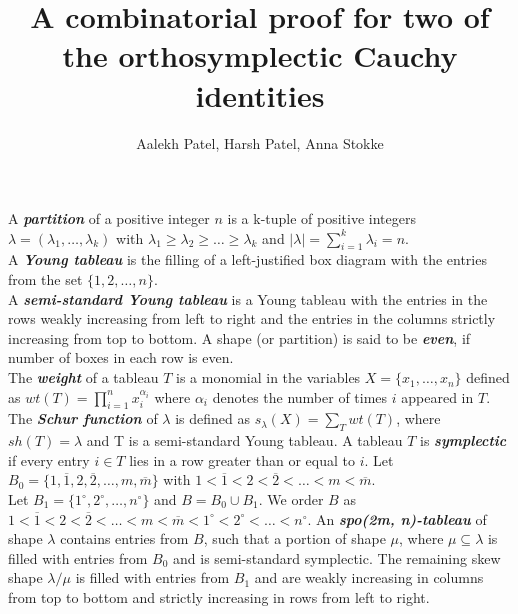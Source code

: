 \documentclass[25pt, a0paper]{tikzposter}
\renewcommand{\textit}[1]{\emph{\textbf{#1}}}
\begin{document}
\title{\LARGE A combinatorial proof for two of the orthosymplectic Cauchy identities}
\author{\LARGE Aalekh Patel, Harsh Patel, Anna Stokke}
\maketitle
{}
{	
	\begin{multicols*}{3}
	\small
		A \textit{partition} of a positive integer $n$ is a k-tuple of positive integers $\lambda = (\lambda_1, \ldots,  \lambda_k) $ with $\lambda_1 \ge \lambda_2 \ge \ldots \ge \lambda_k $ and $|\lambda| = \sum_{i=1}^{k} \lambda_i = n $.\\
		A \textit{Young tableau} is the filling of a left-justified box diagram with the entries from the set $\{1, 2, \ldots, n\}$.\\
		A \textit{semi-standard Young tableau} is a Young tableau with the entries in the rows weakly increasing from left to right and the entries in the columns strictly increasing from top to bottom.
		 A shape (or partition) is said to be \textit{even}, if number of boxes in each row is even.\\
		The \textit{weight} of a tableau $T$ is a monomial in the variables $X = \{x_1, \ldots, x_n\}$ defined as $ wt(T) = \prod_{i=1}^{n} x_i^{\alpha_i} $ where $\alpha_i $ denotes the number of times $i$ appeared in $T$.\\
		The \textit{Schur function} of $\lambda$ is defined as $ s_\lambda(X) = \sum_{T} wt(T) $, where $sh(T)=\lambda$ and T is a semi-standard Young tableau.
		\vfill
		\columnbreak
    	A tableau $T$ is \textit{symplectic} if every entry $i \in T$ lies in a row greater than or equal to $i$.
		Let $B_0 = \{1, \overline{1}, 2, \overline{2}, \ldots, m, \overline{m}\}$ with $1 < \overline{1} < 2 < \overline{2} < \ldots < m < \overline{m} $.\\
		Let $B_1 = \{1^\circ, 2^\circ, \ldots, n^\circ\} $ and $B = B_0 \cup B_1 $. We order $B$ as $1 < \overline{1} < 2 < \overline{2} < \ldots < m < \overline{m} < 1^\circ < 2^\circ < \ldots < n^\circ $.
		An \textit{spo(2m, n)-tableau} of shape $\lambda$ contains entries from $B$, such that a portion of shape $\mu$, where $\mu \subseteq \lambda $ is filled with entries from $B_0 $ and is semi-standard symplectic. The remaining skew shape $\lambda/\mu$ is filled with entries from $B_1 $ and are weakly increasing in columns from top to bottom and strictly increasing in rows from left to right.

\end{multicols*}}
\end{document}

